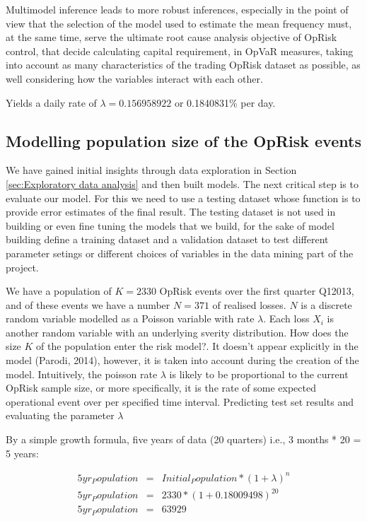 \documentclass{DissertateUSU}
\begin{document}
Multimodel inference leads to more robust inferences, especially in the
point of view that the selection of the model used to estimate the mean
frequency must, at the same time, serve the ultimate root cause analysis
objective of OpRisk control, that decide calculating capital
requirement, in OpVaR measures, taking into account as many
characteristics of the trading OpRisk dataset as possible, as well
considering how the variables interact with each other.

Yields a daily rate of \(\lambda = 0.156958922\) or 0.1840831\% per
day.\medskip

\subsection{Modelling population size of the OpRisk events}

We have gained initial insights through data exploration in Section
\ref{sec:Exploratory data analysis} and then built models. The next
critical step is to evaluate our model. For this we need to use a
testing dataset whose function is to provide error estimates of the
final result. The testing dataset is not used in building or even fine
tuning the models that we build, for the sake of model building define a
training dataset and a validation dataset to test different parameter
setings or different choices of variables in the data mining part of the
project.\medskip

We have a population of \(K = 2330\) OpRisk events over the first
quarter Q12013, and of these events we have a number \(N = 371\) of
realised losses. \(N\) is a discrete random variable modelled as a
Poisson variable with rate \(\lambda\). Each loss \(X_i\) is another
random variable with an underlying sverity distribution. How does the
size \(K\) of the population enter the risk model?. It doesn't appear
explicitly in the model (Parodi, 2014), however, it is taken into
account during the creation of the model. Intuitively, the poisson rate
\(\lambda\) is likely to be proportional to the current OpRisk sample
size, or more specifically, it is the rate of some expected operational
event over per specified time interval. Predicting test set results and
evaluating the parameter \(\lambda\)

By a simple growth formula, five years of data (20 quarters) i.e., 3
months * 20 = 5 years:

\singlespacing

\begin{eqnarray}
5yr_Population &=& Initial_Population * (1 + \lambda)^n \nonumber \\
5yr_Population &=& 2330*(1+0.18009498)^20 \nonumber \\
5yr_Population &=& 63929
\end{eqnarray} \doublespacing
\end{document}
